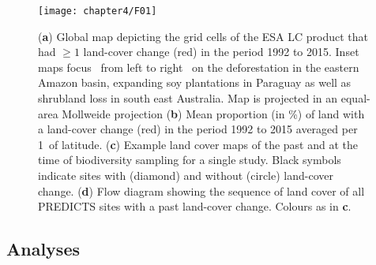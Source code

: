 \begin{figure}[htb]
\centering
\texttt{[image: chapter4/F01]}
\caption{ (\textbf{a}) Global map depicting the grid cells of the ESA LC product that had $\geq 1$ land-cover change (red) in the period 1992 to 2015. Inset maps focus \textendash\ from left to right \textendash\ on the deforestation in the eastern Amazon basin, expanding soy plantations in Paraguay as well as shrubland loss in south east Australia. Map is projected in an equal-area Mollweide projection (\textbf{b}) Mean proportion (in \%) of land with a land-cover change (red) in the period 1992 to 2015 averaged per 1\textdegree\ of latitude. (\textbf{c}) Example land cover maps of the past and at the time of biodiversity sampling for a single study. Black symbols indicate sites with (diamond) and without (circle) land-cover change. (\textbf{d}) Flow diagram showing the sequence of land cover of all PREDICTS sites with a past land-cover change. Colours as in \textbf{c}.  }
\label{F04_01}
\end{figure}

\subsection{Analyses}
\label{C04_0203}

